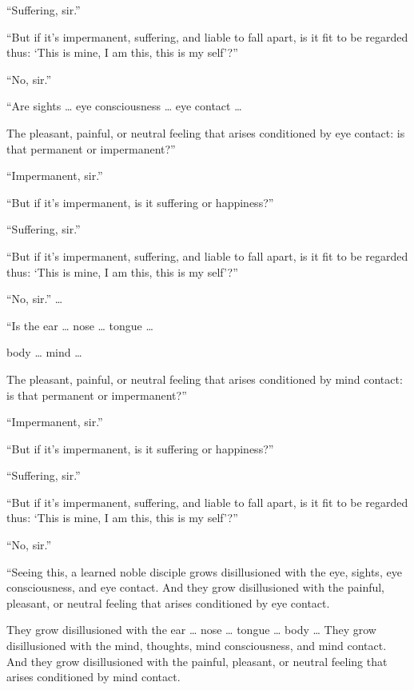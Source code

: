 \documentclass[12pt,openany]{book}%
\begin{document}
“Suffering, sir.” 

“But if it’s impermanent, suffering, and liable to fall apart, is it fit to be regarded thus: ‘This is mine, I am this, this is my self’?” 

“No, sir.” 

“Are sights … eye consciousness … eye contact … 

The pleasant, painful, or neutral feeling that arises conditioned by eye contact: is that permanent or impermanent?” 

“Impermanent, sir.” 

“But if it’s impermanent, is it suffering or happiness?” 

“Suffering, sir.” 

“But if it’s impermanent, suffering, and liable to fall apart, is it fit to be regarded thus: ‘This is mine, I am this, this is my self’?” 

“No, sir.” … 

“Is the ear … nose … tongue … 

body … mind … 

The pleasant, painful, or neutral feeling that arises conditioned by mind contact: is that permanent or impermanent?” 

“Impermanent, sir.” 

“But if it’s impermanent, is it suffering or happiness?” 

“Suffering, sir.” 

“But if it’s impermanent, suffering, and liable to fall apart, is it fit to be regarded thus: ‘This is mine, I am this, this is my self’?” 

“No, sir.” 

“Seeing this, a learned noble disciple grows disillusioned with the eye, sights, eye consciousness, and eye contact. And they grow disillusioned with the painful, pleasant, or neutral feeling that arises conditioned by eye contact. 

They grow disillusioned with the ear … nose … tongue … body … They grow disillusioned with the mind, thoughts, mind consciousness, and mind contact. And they grow disillusioned with the painful, pleasant, or neutral feeling that arises conditioned by mind contact. 
\end{document}
